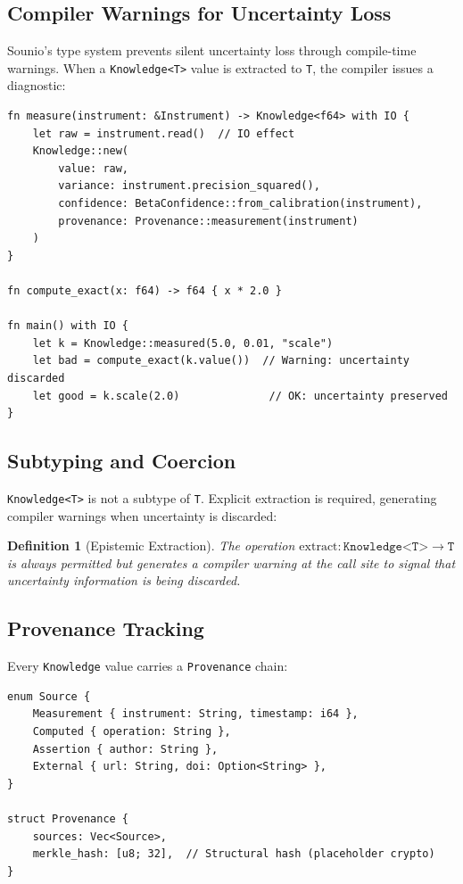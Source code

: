 \documentclass[11pt,a4paper]{article}
\newtheorem{definition}{Definition}
\begin{document}
\subsection{Compiler Warnings for Uncertainty Loss}

Sounio's type system prevents silent uncertainty loss through compile-time
warnings. When a \texttt{Knowledge<T>} value is extracted to \texttt{T},
the compiler issues a diagnostic:

\begin{lstlisting}[caption={Uncertainty extraction warning}]
fn measure(instrument: &Instrument) -> Knowledge<f64> with IO {
    let raw = instrument.read()  // IO effect
    Knowledge::new(
        value: raw,
        variance: instrument.precision_squared(),
        confidence: BetaConfidence::from_calibration(instrument),
        provenance: Provenance::measurement(instrument)
    )
}

fn compute_exact(x: f64) -> f64 { x * 2.0 }

fn main() with IO {
    let k = Knowledge::measured(5.0, 0.01, "scale")
    let bad = compute_exact(k.value())  // Warning: uncertainty discarded
    let good = k.scale(2.0)              // OK: uncertainty preserved
}
\end{lstlisting}

\subsection{Subtyping and Coercion}

\texttt{Knowledge<T>} is not a subtype of \texttt{T}. Explicit extraction is
required, generating compiler warnings when uncertainty is discarded:

\begin{definition}[Epistemic Extraction]
The operation $\text{extract}: \texttt{Knowledge<T>} \to \texttt{T}$ is
always permitted but generates a compiler warning at the call site to
signal that uncertainty information is being discarded.
\end{definition}

\subsection{Provenance Tracking}

Every \texttt{Knowledge} value carries a \texttt{Provenance} chain:

\begin{lstlisting}[caption={Provenance structure}]
enum Source {
    Measurement { instrument: String, timestamp: i64 },
    Computed { operation: String },
    Assertion { author: String },
    External { url: String, doi: Option<String> },
}

struct Provenance {
    sources: Vec<Source>,
    merkle_hash: [u8; 32],  // Structural hash (placeholder crypto)
}
\end{lstlisting}
\end{document}
